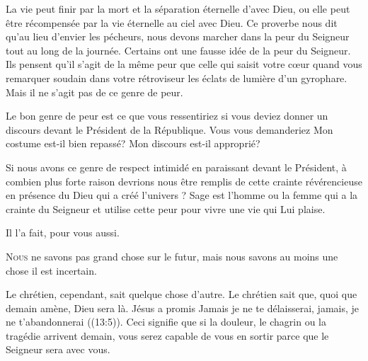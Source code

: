 
La vie peut finir par la mort et la séparation éternelle d'avec Dieu,
 ou elle peut être récompensée par la vie éternelle au ciel avec Dieu.
 Ce proverbe nous dit qu'au lieu d'envier les pécheurs,
 nous devons marcher dans la peur 
 du Seigneur tout au long de la journée.
 Certains ont une fausse idée de la peur du Seigneur.
 Ils pensent qu'il s'agit de la même peur que celle qui saisit votre c\oe{}ur
 quand vous remarquer soudain dans votre rétroviseur les éclats de lumière
 d'un gyrophare. Mais il ne s'agit pas de ce genre de peur. 

Le bon genre de peur est ce que vous ressentiriez si vous deviez donner
 un discours devant le Président de la République.
 Vous vous demanderiez\frcolon{} 
 \Og Mon costume est-il bien repassé? 
 Mon discours est-il approprié? \Fg{}

Si nous avons ce genre de respect intimidé en paraissant devant le Président,
 à combien plus forte raison devrions nous être remplis de cette crainte
 révérencieuse en présence du Dieu qui a créé l'univers ?
 Sage est l'homme ou la femme qui a la crainte du Seigneur
 \ocadr et utilise cette peur pour vivre une vie qui Lui plaise. 

Il l'a fait, pour vous aussi.

\dvrule







\lettrine{N}{ous} ne savons pas grand chose sur le futur,
 mais nous savons au moins une chose\frcolon{} il est incertain. 

Le chrétien, cependant, sait quelque chose d'autre.
 Le chrétien sait que, quoi que demain amène, Dieu sera là.
 Jésus a promis\frcolon{}
 \Og Jamais je ne te délaisserai, jamais, je ne t'abandonnerai \Fg{}
 ((13:5)).
 Ceci signifie que si la douleur, le chagrin ou la tragédie arrivent 
 demain, vous serez capable de vous en sortir
 parce que le Seigneur sera avec vous. 

